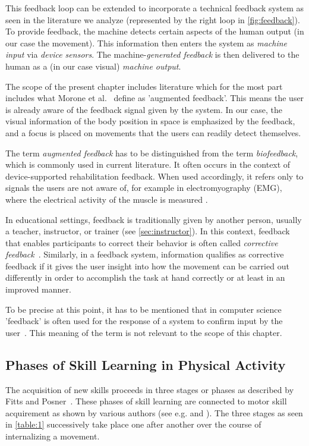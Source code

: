 This feedback loop can be extended to incorporate a technical feedback system as seen in the literature we analyze (represented by the right loop in \autoref{fig:feedback}). To provide feedback, the machine detects certain aspects of the human output (in our case the movement). This information then enters the system as \emph{machine input} via \emph{device sensors}. The machine-\emph{generated feedback} is then delivered to the human as a (in our case visual) \emph{machine output}.

The scope of the present chapter includes literature which for the most part includes what Morone et al.~\cite{morone2021dab} define as 'augmented feedback'. This means the user is already aware of the feedback signal given by the system. In our case, the visual information of the body position in space is emphasized by the feedback, and a focus is placed on movements that the users can readily detect themselves.

The term \emph{augmented feedback} has to be distinguished from the term \emph{biofeedback}, which is commonly used in current literature. It often occurs in the context of device-supported rehabilitation feedback. When used accordingly, it refers only to signals the users are not aware of, for example in electromyography (EMG), where the electrical activity of the muscle is measured \cite{mills2005bem}.

In educational settings, feedback is traditionally given by another person, usually a teacher, instructor, or trainer (see \autoref{sec:instructor}). In this context, feedback that enables participants to correct their behavior is often called \emph{corrective feedback}~\cite{hattie:2007:Feedback,Lysakowski:1982:Feedback}. Similarly, in a feedback system, information qualifies as corrective feedback if it gives the user insight into how the movement can be carried out differently in order to accomplish the task at hand correctly or at least in an improved manner. 

To be precise at this point, it has to be mentioned that in computer science 'feedback' is often used for the response of a system to confirm input by the user~\cite{ADictionaryofComputerScience}. This meaning of the term is not relevant to the scope of this chapter.

\subsection{Phases of Skill Learning in Physical Activity\label{sec:stages}}
The acquisition of new skills proceeds in three stages or phases as described by Fitts and Posner~\cite{fitts1967HPe}. These phases of skill learning are connected to motor skill acquirement as shown by various authors (see e.g. \cite{schmidt2004motor,SWINNEN1997749,SINGER197879} and \cite{taylor2012rsm}). The three stages as seen in \autoref{table:1} successively take place one after another over the course of internalizing a movement.

